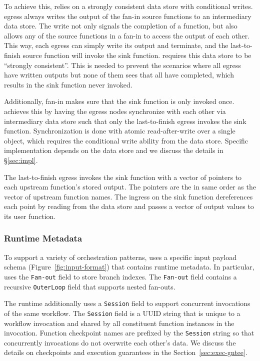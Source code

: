 To achieve this, \name{} relies on a strongly consistent data store with
conditional writes. \name{} egress always writes the output of the fan-in
source functions to an intermediary data store. The write not only signals the
completion of a function, but also allows any of the source functions in a
fan-in to access the output of each other. This way, each egress can simply
write its output and terminate, and the last-to-finish source function will
invoke the sink function.
\name{} requires this data store to be ``strongly consistent''. This is needed
to prevent the scenarios where all egress have written outputs but none of
them sees that all have completed, which results in the sink function never
invoked.

Additionally, fan-in makes sure that the sink function is only invoked once.
\name{} achieves this by having the egress nodes synchronize with each other
via intermediary data store such that only the last-to-finish egress invokes
the sink function. Synchronization is done with atomic read-after-write over a
single object, which requires the conditional write ability from the data
store. Specific implementation depends on the data store and we discuss the
details in \S\ref{sec:impl}.

The last-to-finish egress invokes the sink function with a vector of pointers
to each upstream function's stored output. The pointers are the in same order
as the vector of upstream function names. The ingress on the sink function
dereferences each point by reading from the data store and passes a vector of
output values to its user function.


\subsubsection{Runtime Metadata}

To support a variety of orchestration patterns, \name{} uses a
specific input payload schema (Figure~\ref{fig:input-format}) that
contains \name{} runtime metadata. In particular, \name{} uses the
\texttt{Fan-out} field to store branch indexes. The \texttt{Fan-out} field
contains a recursive \texttt{OuterLoop} field that supports nested fan-outs.

The runtime additionally uses a \texttt{Session} field to support concurrent
invocations of the same workflow. The \texttt{Session} field is a UUID string
that is unique to a workflow invocation and shared by all constituent function
instances in the invocation. Function checkpoint names are prefixed by the \texttt{Session} string so that
concurrently invocations do not overwrite each other's data. We discuss the details on
\name{} checkpoints and execution guarantees in the Section~\ref{sec:exec-gntee}.
